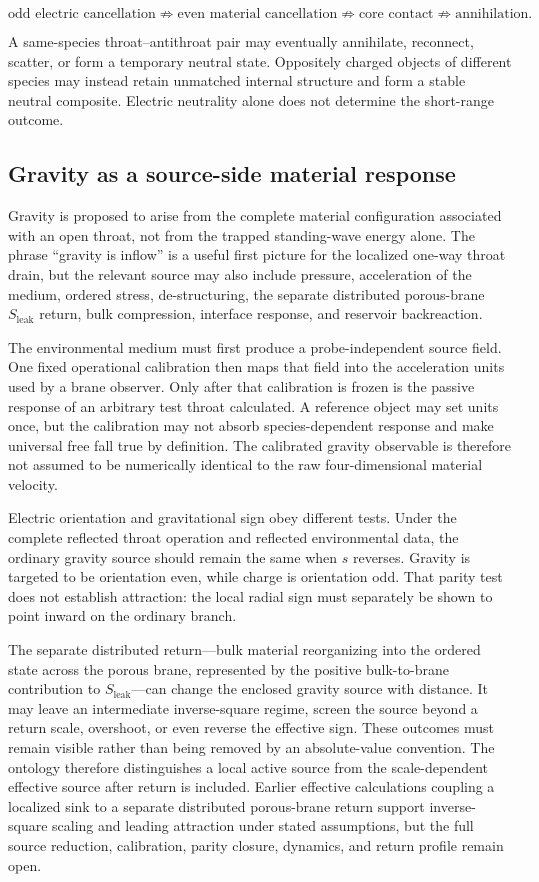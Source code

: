 \[
\text{odd electric cancellation}
\not\Rightarrow
\text{even material cancellation}
\not\Rightarrow
\text{core contact}
\not\Rightarrow
\text{annihilation}.
\]

A same-species throat--antithroat pair may eventually annihilate, reconnect,
scatter, or form a temporary neutral state. Oppositely charged objects of
different species may instead retain unmatched internal structure and form a
stable neutral composite. Electric neutrality alone does not determine the
short-range outcome.

\subsection{Gravity as a source-side material response}

Gravity is proposed to arise from the complete material configuration associated
with an open throat, not from the trapped standing-wave energy alone. The phrase
``gravity is inflow'' is a useful first picture for the localized one-way throat
drain, but the relevant source may also include pressure, acceleration of the
medium, ordered stress, de-structuring, the separate distributed porous-brane
\(S_{\mathrm{leak}}\) return, bulk compression, interface response, and
reservoir backreaction.

The environmental medium must first produce a probe-independent source field.
One fixed operational calibration then maps that field into the acceleration
units used by a brane observer. Only after that calibration is frozen is the
passive response of an arbitrary test throat calculated. A reference object may
set units once, but the calibration may not absorb species-dependent response
and make universal free fall true by definition. The calibrated gravity
observable is therefore not assumed to be numerically identical to the raw
four-dimensional material velocity.

Electric orientation and gravitational sign obey different tests. Under the
complete reflected throat operation and reflected environmental data, the
ordinary gravity source should remain the same when \(s\) reverses. Gravity is
targeted to be orientation even, while charge is orientation odd. That parity
test does not establish attraction: the local radial sign must separately be
shown to point inward on the ordinary branch.

The separate distributed return---bulk material reorganizing into the ordered
state across the porous brane, represented by the positive bulk-to-brane
contribution to \(S_{\mathrm{leak}}\)---can change the enclosed gravity source
with distance. It may
leave an intermediate inverse-square regime, screen the source beyond a return
scale, overshoot, or even reverse the effective sign. These outcomes must remain
visible rather than being removed by an absolute-value convention. The ontology
therefore distinguishes a local active source from the scale-dependent effective
source after return is included. Earlier effective calculations coupling a
localized sink to a separate distributed porous-brane return support
inverse-square scaling and leading attraction under stated assumptions, but the
full source reduction, calibration, parity closure, dynamics, and return profile
remain open.

